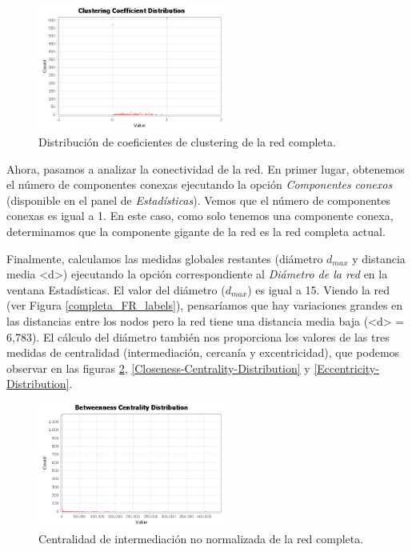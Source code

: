 \documentclass{uimppracticas}
\begin{document}
\begin{figure}[H]
	\centering
	\includegraphics[width=0.55\textwidth]{images/clustering-coefficient}
	\caption{Distribución de coeficientes de clustering de la red completa.}
	\label{clustering-coefficient}
\end{figure}

Ahora, pasamos a analizar la conectividad de la red. En primer lugar, obtenemos el número de componentes conexas ejecutando la opción \textit{Componentes conexos} (disponible en el panel de \textit{Estadísticas}). Vemos  que el número de componentes conexas es igual a 1. En este caso, como solo tenemos una componente conexa, determinamos que la componente gigante de la red es la red completa actual.

Finalmente, calculamos las medidas globales restantes (diámetro $d_{max}$ y distancia media <d>) ejecutando la opción correspondiente al \textit{Diámetro de la red} en la ventana {Estadísticas}. El valor del diámetro ($d_{max}$) es igual a 15. Viendo la red (ver Figura \ref{completa_FR_labels}), pensaríamos que hay variaciones grandes en las distancias entre los nodos pero la red tiene una distancia media baja (<d> = 6,783). El cálculo del diámetro también nos proporciona los valores de las tres medidas de centralidad (intermediación, cercanía y excentricidad), que podemos observar en las figuras \ref{Betweenness-Centrality-Distribution}, \ref{Closeness-Centrality-Distribution} y \ref{Eccentricity-Distribution}.

\begin{figure}[H]
	\centering
	\includegraphics[width=0.55\textwidth]{images/Betweenness-Centrality-Distribution}
	\caption{Centralidad de intermediación no normalizada de la red completa.}
	\label{Betweenness-Centrality-Distribution}
\end{figure}
\end{document}
